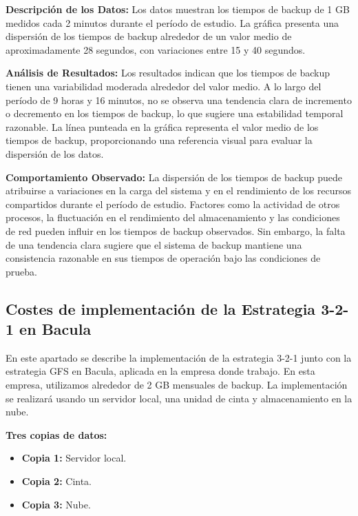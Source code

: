 \textbf{Descripción de los Datos:}
Los datos muestran los tiempos de backup de 1 GB medidos cada 2 minutos durante el período de estudio. La gráfica presenta una dispersión de los tiempos de backup alrededor de un valor medio de aproximadamente 28 segundos, con variaciones entre 15 y 40 segundos.

\textbf{Análisis de Resultados:}
Los resultados indican que los tiempos de backup tienen una variabilidad moderada alrededor del valor medio. A lo largo del período de 9 horas y 16 minutos, no se observa una tendencia clara de incremento o decremento en los tiempos de backup, lo que sugiere una estabilidad temporal razonable. La línea punteada en la gráfica representa el valor medio de los tiempos de backup, proporcionando una referencia visual para evaluar la dispersión de los datos.

\textbf{Comportamiento Observado:}
La dispersión de los tiempos de backup puede atribuirse a variaciones en la carga del sistema y en el rendimiento de los recursos compartidos durante el período de estudio. Factores como la actividad de otros procesos, la fluctuación en el rendimiento del almacenamiento y las condiciones de red pueden influir en los tiempos de backup observados. Sin embargo, la falta de una tendencia clara sugiere que el sistema de backup mantiene una consistencia razonable en sus tiempos de operación bajo las condiciones de prueba.


\subsection{Costes de implementación de la Estrategia 3-2-1 en Bacula}

En este apartado se describe la implementación de la estrategia 3-2-1 junto con la estrategia GFS en Bacula, aplicada en la empresa donde trabajo. En esta empresa, utilizamos alrededor de 2 GB mensuales de backup. La implementación se realizará usando un servidor local, una unidad de cinta y almacenamiento en la nube.

\textbf{Tres copias de datos:}
\begin{itemize}
    \item \textbf{Copia 1:} Servidor local.
    \item \textbf{Copia 2:} Cinta.
    \item \textbf{Copia 3:} Nube.
\end{itemize}




